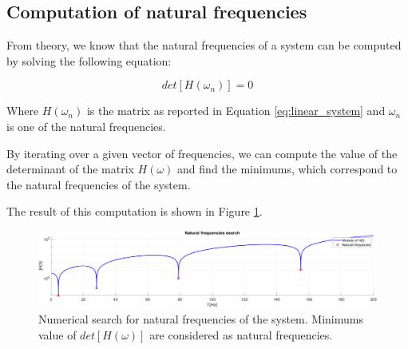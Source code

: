\subsection{Computation of natural frequencies}
\label{subsec:natural_frequencies}

From theory, we know that the natural frequencies of a system can be computed by solving the following equation:

\begin{equation}
    det[H(\omega_n)] = 0
\end{equation}

Where $H(\omega_n)$ is the matrix as reported in Equation \ref{eq:linear_system} and $\omega_n$ is one of the natural frequencies.

By iterating over a given vector of frequencies, we can compute the value of the determinant of the matrix $H(\omega)$ and find the minimums, which correspond to the natural frequencies of the system.

The result of this computation is shown in Figure \ref{fig:natural_frequencies}.

\begin{figure}[H]
    \centering
    \includegraphics[width=\textwidth]{img/MATLAB/Part_A/H_module.png}
    \caption{Numerical search for natural frequencies of the system. Minimums value of $det[H(\omega)]$ are considered as natural frequencies.}
    \label{fig:natural_frequencies}
\end{figure}

